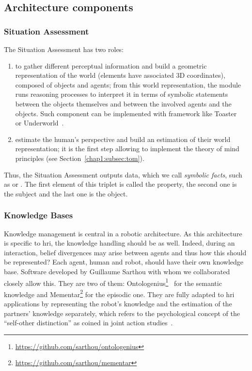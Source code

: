 \documentclass[a4paper,11pt,twoside]{StyleThese}
\begin{document}
\subsection{Architecture components}

\subsubsection{Situation Assessment}\label{chap3:subsubsec:sa}
The Situation Assessment has two roles:
\begin{enumerate}
	\item  to gather different perceptual information and build a geometric representation of the world (\ie elements have associated 3D coordinates), composed of objects and agents; from this world representation, the module runs reasoning processes to interpret it in terms of symbolic statements between the objects themselves and between the involved agents and the objects. Such component can be implemented with framework like Toaster~\cite{milliez_2014_framework} or Underworld~\cite{lemaignan_2018_underworlds}.
	\item estimate the human's perspective and build an estimation of their world representation; it is the first step allowing to implement the theory of mind principles (see Section~\ref{chap1:subsec:tom}).
\end{enumerate}

Thus, the Situation Assessment outputs data, which we call \textit{symbolic facts}, such as  or . The first element of this triplet is called the property, the second one is the subject and the last one is the object.

\subsubsection{Knowledge Bases}\label{chap3:subsubsec:kb}

Knowledge management is central in a robotic architecture. As this architecture is specific to \acrshort{hri}, the knowledge handling should be as well. Indeed, during an interaction, belief divergences may arise between agents and thus how this should be represented? Each agent, human and robot, should have their own knowledge base. Software developed by Guillaume Sarthou with whom we collaborated closely allow this. They are two of them: Ontologenius\footnote{\url{https://github.com/sarthou/ontologenius}}~\cite{sarthou_2019_ontologenius} for the semantic knowledge and Mementar\footnote{\url{https://github.com/sarthou/mementar}} for the episodic one. They are fully adapted to \acrshort{hri} applications by representing the robot's knowledge and the estimation of the partners' knowledge separately, which refers to the psychological concept of the ``self-other distinction'' as coined in joint action studies~\cite{pacherie_2012_agency}.  
\end{document}

